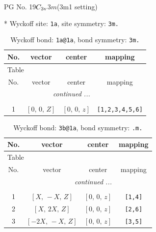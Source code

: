\documentclass[fleqn,8pt]{jsarticle}
\begin{document}
\setcounter{MaxMatrixCols}{32}

\renewcommand{\tablename}{Table~}
\renewcommand{\figurename}{Figure~}
\begin{center}
\LARGE
PG No. 19\quad$C_{\rm 3v}$\quad$3m$\quad(3m1 setting)\quad[ trigonal ]
\end{center}


* Wyckoff site: {\tt 1a}, site symmetry: {\tt 3m.}
\renewcommand{\arraystretch}{1.2}
\begin{longtable}{cccc}
\caption{Wyckoff bond: {\tt 1a@1a}, bond symmetry: {\tt 3m.}}
 \\
 \hline \hline
No. & vector & center & mapping \\ \hline \endfirsthead

\multicolumn{3}{l}{\tablename\ \thetable{}} \\
 \hline \hline
No. & vector & center & mapping \\ \hline \endhead

 \hline \hline
\multicolumn{3}{r}{\footnotesize\it continued ...} \\ \endfoot

 \hline \hline
\multicolumn{3}{r}{} \\ \endlastfoot

1 & $\left[ 0,\, 0,\, Z \right]$ & $\left[ 0,\, 0,\, z \right]$ & {\tt [1,2,3,4,5,6]} \\
\end{longtable}
\renewcommand{\arraystretch}{1.2}
\begin{longtable}{cccc}
\caption{Wyckoff bond: {\tt 3b@1a}, bond symmetry: {\tt .m.}}
 \\
 \hline \hline
No. & vector & center & mapping \\ \hline \endfirsthead

\multicolumn{3}{l}{\tablename\ \thetable{}} \\
 \hline \hline
No. & vector & center & mapping \\ \hline \endhead

 \hline \hline
\multicolumn{3}{r}{\footnotesize\it continued ...} \\ \endfoot

 \hline \hline
\multicolumn{3}{r}{} \\ \endlastfoot

1 & $\left[ X,\, - X,\, Z \right]$ & $\left[ 0,\, 0,\, z \right]$ & {\tt [1,4]} \\ \hline
2 & $\left[ X,\, 2 X,\, Z \right]$ & $\left[ 0,\, 0,\, z \right]$ & {\tt [2,6]} \\ \hline
3 & $\left[ - 2 X,\, - X,\, Z \right]$ & $\left[ 0,\, 0,\, z \right]$ & {\tt [3,5]} \\
\end{longtable}
\end{document}
